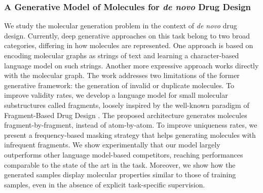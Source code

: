 \subsubsection*{A Generative Model of Molecules for \emph{de novo} Drug Design}
We study the molecular generation problem in the context of \emph{de novo} drug design. Currently, deep generative approaches on this task belong to two broad categories, differing in how molecules are represented. One approach is based on encoding molecular graphs as strings of text and learning a character-based language model on such strings. Another more expressive approach works directly with the molecular graph. The work addresses two limitations of the former generative framework: the generation of invalid or duplicate molecules. To improve validity rates, we develop a language model for small molecular substructures called fragments, loosely inspired by the well-known paradigm of Fragment-Based Drug Design \citep{erlanson2004fbdd}. The proposed architecture generates molecules fragment-by-fragment, instead of atom-by-atom. To improve uniqueness rates, we present a frequency-based masking strategy that helps generating molecules with infrequent fragments. We show experimentally that our model largely outperforms other language model-based competitors, reaching performances comparable to the state of the art in the task. Moreover, we show how the generated samples display molecular properties similar to those of training samples, even in the absence of explicit task-specific supervision.

